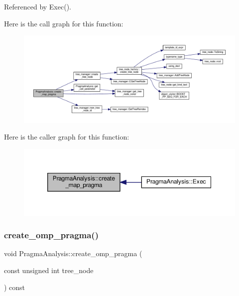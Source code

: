Referenced by Exec().

Here is the call graph for this function\+:
\nopagebreak
\begin{figure}[H]
\begin{center}
\leavevmode
\includegraphics[width=350pt]{d1/d63/classPragmaAnalysis_a61f2585acbea186f129a12e0cc7ef7d0_cgraph}
\end{center}
\end{figure}
Here is the caller graph for this function\+:
\nopagebreak
\begin{figure}[H]
\begin{center}
\leavevmode
\includegraphics[width=350pt]{d1/d63/classPragmaAnalysis_a61f2585acbea186f129a12e0cc7ef7d0_icgraph}
\end{center}
\end{figure}
\mbox{\label{classPragmaAnalysis_ad01dc50d645a9d61e4bf56fdb2ed34f0}} 
\subsubsection{\texorpdfstring{create\+\_\+omp\+\_\+pragma()}{create\_omp\_pragma()}}
{\footnotesize\ttfamily void Pragma\+Analysis\+::create\+\_\+omp\+\_\+pragma (\begin{DoxyParamCaption}\item[{const unsigned int}]{tree\+\_\+node }\end{DoxyParamCaption}) const\hspace{0.3cm}{\ttfamily [private]}}



